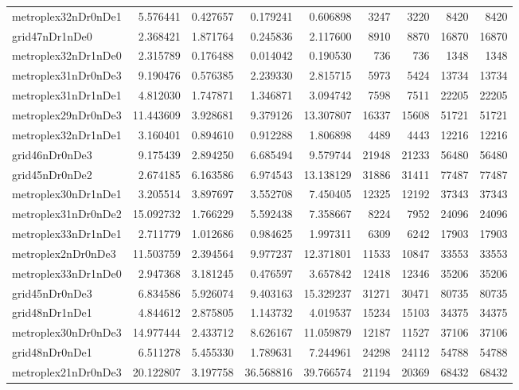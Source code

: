 \begin{longtable}{|l|r|r|r|r|r|r|r|r|}
metroplex32nDr0nDe1 & 5.576441 & 0.427657 & 0.179241 & 0.606898 & 3247 & 3220 & 8420 & 8420 \\
grid47nDr1nDe0 & 2.368421 & 1.871764 & 0.245836 & 2.117600 & 8910 & 8870 & 16870 & 16870 \\
metroplex32nDr1nDe0 & 2.315789 & 0.176488 & 0.014042 & 0.190530 & 736 & 736 & 1348 & 1348 \\
metroplex31nDr0nDe3 & 9.190476 & 0.576385 & 2.239330 & 2.815715 & 5973 & 5424 & 13734 & 13734 \\
metroplex31nDr1nDe1 & 4.812030 & 1.747871 & 1.346871 & 3.094742 & 7598 & 7511 & 22205 & 22205 \\
metroplex29nDr0nDe3 & 11.443609 & 3.928681 & 9.379126 & 13.307807 & 16337 & 15608 & 51721 & 51721 \\
metroplex32nDr1nDe1 & 3.160401 & 0.894610 & 0.912288 & 1.806898 & 4489 & 4443 & 12216 & 12216 \\
grid46nDr0nDe3 & 9.175439 & 2.894250 & 6.685494 & 9.579744 & 21948 & 21233 & 56480 & 56480 \\
grid45nDr0nDe2 & 2.674185 & 6.163586 & 6.974543 & 13.138129 & 31886 & 31411 & 77487 & 77487 \\
metroplex30nDr1nDe1 & 3.205514 & 3.897697 & 3.552708 & 7.450405 & 12325 & 12192 & 37343 & 37343 \\
metroplex31nDr0nDe2 & 15.092732 & 1.766229 & 5.592438 & 7.358667 & 8224 & 7952 & 24096 & 24096 \\
metroplex33nDr1nDe1 & 2.711779 & 1.012686 & 0.984625 & 1.997311 & 6309 & 6242 & 17903 & 17903 \\
metroplex2nDr0nDe3 & 11.503759 & 2.394564 & 9.977237 & 12.371801 & 11533 & 10847 & 33553 & 33553 \\
metroplex33nDr1nDe0 & 2.947368 & 3.181245 & 0.476597 & 3.657842 & 12418 & 12346 & 35206 & 35206 \\
grid45nDr0nDe3 & 6.834586 & 5.926074 & 9.403163 & 15.329237 & 31271 & 30471 & 80735 & 80735 \\
grid48nDr1nDe1 & 4.844612 & 2.875805 & 1.143732 & 4.019537 & 15234 & 15103 & 34375 & 34375 \\
metroplex30nDr0nDe3 & 14.977444 & 2.433712 & 8.626167 & 11.059879 & 12187 & 11527 & 37106 & 37106 \\
grid48nDr0nDe1 & 6.511278 & 5.455330 & 1.789631 & 7.244961 & 24298 & 24112 & 54788 & 54788 \\
metroplex21nDr0nDe3 & 20.122807 & 3.197758 & 36.568816 & 39.766574 & 21194 & 20369 & 68432 & 68432 \\

\end{longtable}
